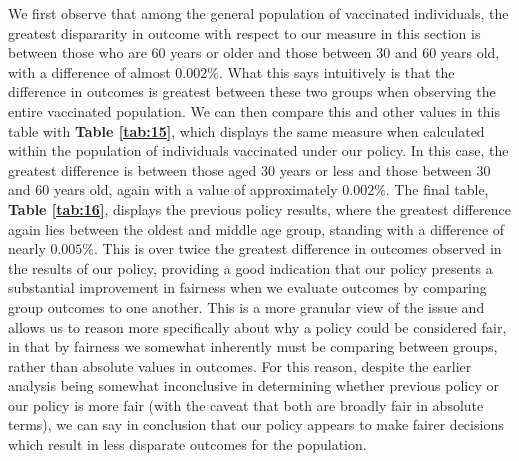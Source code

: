 \documentclass{article}
\begin{document}
We first observe that among the general population of vaccinated individuals, the greatest dispararity in outcome with respect to our measure in this section is between those who are $60$ years or older and those between $30$ and $60$ years old, with a difference of almost $0.002\%$. What this says intuitively is that the difference in outcomes is greatest between these two groups when observing the entire vaccinated population. We can then compare this and other values in this table with \textbf{Table \ref{tab:15}}, which displays the same measure when calculated within the population of individuals vaccinated under our policy. In this case, the greatest difference is between those aged $30$ years or less and those between $30$ and $60$ years old, again with a value of approximately $0.002\%$. The final table, \textbf{Table \ref{tab:16}}, displays the previous policy results, where the greatest difference again lies between the oldest and middle age group, standing with a difference of nearly $0.005\%$. This is over twice the greatest difference in outcomes observed in the results of our policy, providing a good indication that our policy presents a substantial improvement in fairness when we evaluate outcomes by comparing group outcomes to one another. This is a more granular view of the issue and allows us to reason more specifically about why a policy could be considered fair, in that by fairness we somewhat inherently must be comparing between groups, rather than absolute values in outcomes. For this reason, despite the earlier analysis being somewhat inconclusive in determining whether previous policy or our policy is more fair (with the caveat that both are broadly fair in absolute terms), we can say in conclusion that our policy appears to make fairer decisions which result in less disparate outcomes for the population.

\printbibliography
\end{document}
